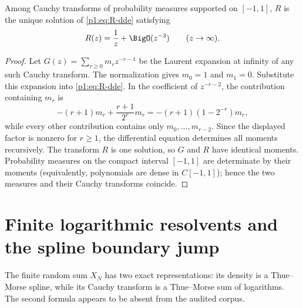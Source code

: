 \documentclass[11pt]{article}
\theoremstyle{definition}
\theoremstyle{remark}
\begin{document}
\begin{proposition}\label{p1:prop:R-uniqueness}
Among Cauchy transforms of probability measures supported on \([-1,1]\), \(R\) is the
unique solution of \eqref{p1:eq:R-dde} satisfying
\begin{equation}
 R(z)=\frac1z+\BigO(z^{-3})\qquad(z\to\infty).               \label{p1:eq:R-normalization}
\end{equation}
\end{proposition}

\begin{proof}
Let \(G(z)=\sum_{r\ge0}m_r z^{-r-1}\) be the Laurent expansion at infinity of any such
Cauchy transform.  The normalization gives \(m_0=1\) and \(m_1=0\).  Substitute this
expansion into \eqref{p1:eq:R-dde}.  In the coefficient of \(z^{-r-2}\), the contribution
containing \(m_r\) is
\[
 -(r+1)m_r+\frac{r+1}{2^r}m_r
 =-(r+1)(1-2^{-r})m_r,
\]
while every other contribution contains only \(m_0,\ldots,m_{r-2}\).  Since the displayed
factor is nonzero for \(r\ge1\), the differential equation determines all moments
recursively.  The transform \(R\) is one solution, so \(G\) and \(R\) have identical
moments.  Probability measures on the compact interval \([-1,1]\) are determinate by their
moments (equivalently, polynomials are dense in \(C[-1,1]\)); hence the two measures and
their Cauchy transforms coincide.
\end{proof}

\section{Finite logarithmic resolvents and the spline boundary jump}

The finite random sum \(X_N\) has two exact representations: its density is a
Thue--Morse spline, while its Cauchy transform is a Thue--Morse sum of logarithms.  The
second formula appears to be absent from the audited corpus.
\end{document}
